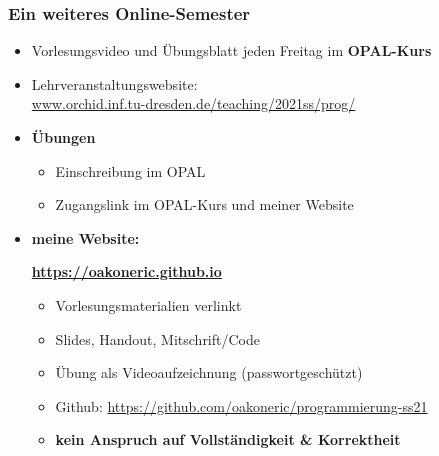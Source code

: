 \documentclass{beamer}
\begin{document}
	\begin{frame} \frametitle{Ein weiteres Online-Semester}
		\footnotesize
		\begin{itemize}[leftmargin=*]
			\item Vorlesungsvideo und Übungsblatt jeden Freitag im \textbf{OPAL-Kurs}
			\item Lehrveranstaltungswebsite: \\ \url{www.orchid.inf.tu-dresden.de/teaching/2021ss/prog/}
			\bigskip \pause
			\item \textbf{Übungen}
			\begin{itemize}
				\item Einschreibung im OPAL
				\item Zugangslink im OPAL-Kurs und meiner Website
			\end{itemize} 
			\bigskip \pause
			\item \textbf{meine Website:} \\[.5em]
			\begin{tcolorbox}[boxsep=0pt,colframe=cddarkblue,colback=cdblue!10]
				\centering
				\textbf{\url{https://oakoneric.github.io}}
			\end{tcolorbox}
			\begin{itemize}
				\item Vorlesungsmaterialien verlinkt
				\item Slides, Handout, Mitschrift/Code
				\item Übung als Videoaufzeichnung (passwortgeschützt)
				\item Github: \url{https://github.com/oakoneric/programmierung-ss21}
				\item \alert{\textbf{kein Anspruch auf Vollständigkeit \& Korrektheit}}
			\end{itemize}
		\end{itemize}
	\end{frame}
\end{document}
